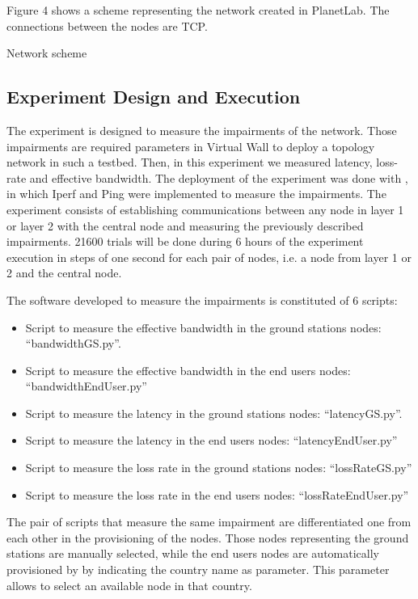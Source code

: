 Figure 4 shows a scheme representing the network created in PlanetLab. The
connections between the nodes are TCP.

Network scheme

\subsection{Experiment Design and Execution}

The experiment is designed to measure the impairments of the network. Those impairments are required parameters in Virtual Wall to deploy a topology network in such a testbed. Then, in this experiment we measured latency, loss-rate and effective bandwidth. The deployment of the experiment was done with \nepi, in which Iperf and Ping were implemented to measure the impairments. The experiment consists of establishing communications between any node in layer 1 or layer 2 with the central node and measuring the previously described impairments. 21600 trials will be done during 6 hours of the experiment execution in steps of one second for each pair of nodes, i.e. a node from layer 1 or 2 and the central node.

The software developed to measure the impairments is constituted of 6 scripts:
\begin{itemize}
\item Script to measure the effective bandwidth in the ground stations nodes: “bandwidthGS.py”. 
\item Script to measure the effective bandwidth in the end users nodes: “bandwidthEndUser.py”
\item Script to measure the latency in the ground stations nodes: “latencyGS.py”.
\item Script to measure the latency  in the end users nodes: “latencyEndUser.py”
\item Script to measure the loss rate in the ground stations nodes: “lossRateGS.py”
\item Script to measure the loss rate in the end users nodes:
  “lossRateEndUser.py”

\end{itemize}

The pair of scripts that measure the same impairment are differentiated one from each other in the provisioning of the nodes. Those nodes representing the ground stations are manually selected, while the end users nodes are automatically provisioned by \nepi by indicating the country name as parameter. This parameter allows \nepi to select an available node in that country. 

